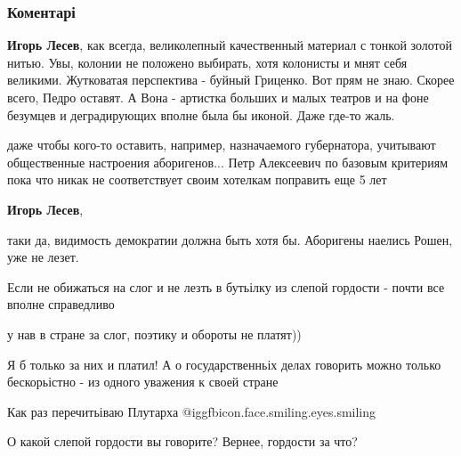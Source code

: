  
 
 
 
 
\subsubsection{Коментарі}
\label{sec:04_08_2018.fb.lesev_igor.1.obezvredit_julju.cmt}

\begin{itemize} %
\textbf{Игорь Лесев}, как всегда, великолепный качественный материал с тонкой золотой нитью.
Увы, колонии не положено выбирать, хотя колонисты и мнят себя великими.
Жутковатая перспектива - буйный Гриценко. Вот прям не знаю. Скорее всего, Педро оставят.
А Вона - артистка больших и малых театров и на фоне безумцев и деградирующих вполне была бы иконой. Даже где-то жаль.

\begin{itemize} %

даже чтобы кого-то оставить, например, назначаемого губернатора, учитывают
общественные настроения аборигенов... Петр Алексеевич по базовым критериям пока
что никак не соответствует своим хотелкам поправить еще 5 лет

\textbf{Игорь Лесев}, 

таки да, видимость демократии должна быть хотя бы. Аборигены наелись Рошен, уже
не лезет.

\end{itemize} %


Если не обижаться на слог и не лезть в бутьілку из слепой гордости - почти все
вполне справедливо

\begin{itemize} %
у нав в стране за слог, поэтику и обороты не платят))

Я б только за них и платил! А о государственньіх делах говорить можно только бескорьістно - из одного уважения к своей стране

Как раз перечитьіваю Плутарха @igg{fbicon.face.smiling.eyes.smiling} 

О какой слепой гордости вы говорите? Вернее, гордости за что?


\end{itemize}
\end{itemize}
